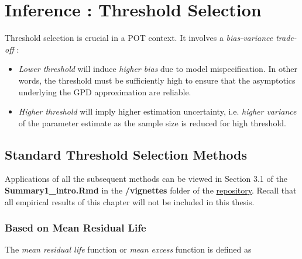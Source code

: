 \section{Inference : Threshold Selection }\label{sec:thresh_selec}

Threshold selection is crucial in a POT context.
It involves a \emph{bias-variance trade-off} :

\begin{itemize}
	\item \emph{Lower threshold} will induce\emph{ higher bias} due to model mispecification. In other words, the threshold must be sufficiently high to ensure that the asymptotics underlying the GPD approximation are reliable.
	
	\item \emph{Higher threshold} will imply higher estimation uncertainty, i.e. \emph{higher variance} of the parameter estimate as the sample size is reduced for high threshold. 
	
\end{itemize}



\subsection{Standard Threshold Selection Methods}


Applications of all the subsequent methods can be viewed in Section 3.1 of the \textbf{Summary1\_intro.Rmd} in the \textbf{/vignettes} folder of the \href{https://github.com/proto4426/PissoortThesis/tree/master/vignettes}{repository}. %
Recall that all empirical results of this chapter will not be included in this thesis.

\subsubsection*{Based on Mean Residual Life}
The \emph{mean residual life} function or \emph{mean excess} function is defined as

